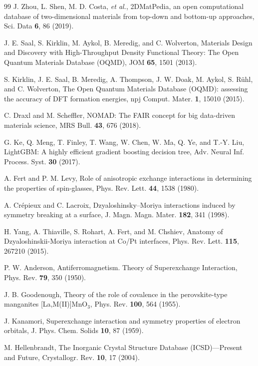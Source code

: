 \documentclass[aps,prb,preprint,superscriptaddress,longbibliography,nofootinbib]{revtex4-2}
\begin{document}
\begin{thebibliography}{99}
 J. Zhou, L. Shen, M. D. Costa, \emph{et al.}, 2DMatPedia, an open computational database of two-dimensional materials from top-down and bottom-up approaches, Sci. Data \textbf{6}, 86 (2019).

 J. E. Saal, S. Kirklin, M. Aykol, B. Meredig, and C. Wolverton, Materials Design and Discovery with High-Throughput Density Functional Theory: The Open Quantum Materials Database (OQMD), JOM \textbf{65}, 1501 (2013).

 S. Kirklin, J. E. Saal, B. Meredig, A. Thompson, J. W. Doak, M. Aykol, S. R\"uhl, and C. Wolverton, The Open Quantum Materials Database (OQMD): assessing the accuracy of DFT formation energies, npj Comput. Mater. \textbf{1}, 15010 (2015).

 C. Draxl and M. Scheffler, NOMAD: The FAIR concept for big data-driven materials science, MRS Bull. \textbf{43}, 676 (2018).

 G. Ke, Q. Meng, T. Finley, T. Wang, W. Chen, W. Ma, Q. Ye, and T.-Y. Liu, LightGBM: A highly
efficient gradient boosting decision tree, Adv. Neural Inf. Process. Syst. \textbf{30} (2017).

 A. Fert and P. M. Levy, Role of anisotropic exchange interactions in determining the
properties of spin-glasses, Phys. Rev. Lett. \textbf{44}, 1538 (1980).

 A. Cr\'epieux and C. Lacroix, Dzyaloshinsky--Moriya interactions induced by symmetry breaking at a surface, J. Magn. Magn. Mater. \textbf{182}, 341 (1998).

 H. Yang, A. Thiaville, S. Rohart, A. Fert, and M. Chshiev, Anatomy of Dzyaloshinskii-Moriya interaction at Co/Pt interfaces, Phys. Rev. Lett. \textbf{115}, 267210 (2015).

 P. W. Anderson, Antiferromagnetism. Theory of Superexchange Interaction, Phys. Rev. \textbf{79}, 350 (1950).

 J. B. Goodenough, Theory of the role of covalence in the perovskite-type manganites [La,M(II)]MnO$_3$, Phys. Rev. \textbf{100}, 564 (1955).

 J. Kanamori, Superexchange interaction and symmetry properties of electron orbitals, J. Phys. Chem. Solids \textbf{10}, 87 (1959).

 M. Hellenbrandt, The Inorganic Crystal Structure Database (ICSD)---Present and Future, Crystallogr. Rev. \textbf{10}, 17 (2004).


\end{thebibliography}
\end{document}
